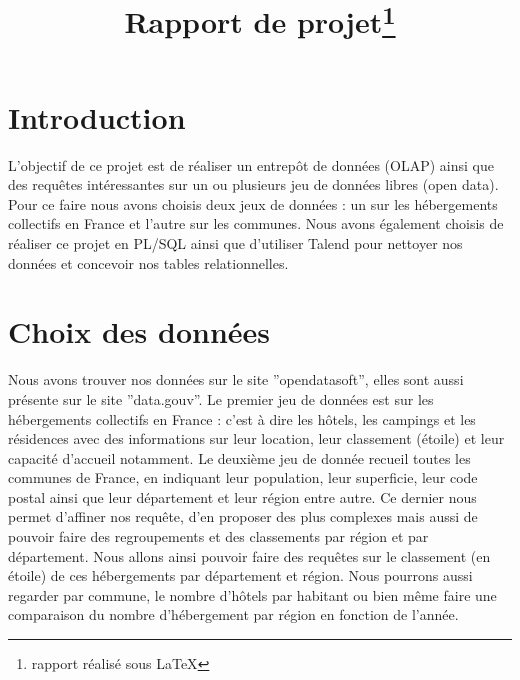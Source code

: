 \documentclass[a4paper,sffamily,12pt]{article}
\title{\vspace{\fill}\LARGE\bfseries\sffamily Rapport de projet\protect\footnote{rapport réalisé sous \LaTeX} \vspace{\fill}}
\begin{document}
	\date{} %
	\maketitle %

	\thispagestyle{fancy} %
	
	\newpage
			
	\renewcommand{\contentsname}{Sommaire}
	\tableofcontents
	
	\newpage
	
	\section{Introduction}

		\vspace{0.5cm}
		
		L'objectif de ce projet est de réaliser un entrepôt de données (OLAP) ainsi que des requêtes intéressantes sur un ou plusieurs jeu de données libres (open data). Pour ce faire nous avons choisis deux jeux de données : un sur les hébergements collectifs en France et l'autre sur les communes. Nous avons également choisis de réaliser ce projet en PL/SQL ainsi que d'utiliser Talend pour nettoyer nos données et concevoir nos tables relationnelles. \\


	\section{Choix des données}				

		\vspace{0.5cm}
		
		 Nous avons trouver nos données sur le site ''opendatasoft'', elles sont aussi présente sur le site ''data.gouv''. Le premier jeu de données est sur les hébergements collectifs en France : c'est à dire les hôtels, les campings et les résidences avec des informations sur leur location, leur classement (étoile) et leur capacité d'accueil notamment. Le deuxième jeu de donnée recueil toutes les communes de France, en indiquant leur population, leur superficie, leur code postal ainsi que leur département et leur région entre autre. Ce dernier nous permet d'affiner nos requête, d'en proposer des plus complexes mais aussi de pouvoir faire des regroupements et des classements par région et par département. Nous allons ainsi pouvoir faire des requêtes sur le classement (en étoile) de ces hébergements par département et région. Nous pourrons aussi regarder par commune, le nombre d'hôtels par habitant ou bien même faire une comparaison du nombre d'hébergement par région en fonction de l'année. \\
\end{document}
